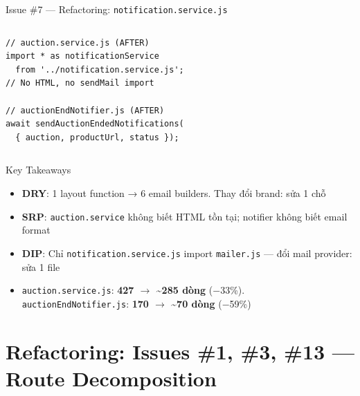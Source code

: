 \documentclass[12pt]{beamer}
\begin{document}
\begin{frame}[fragile]{Issue \#7 — Refactoring: \texttt{notification.service.js}}
\begin{columns}[t]
\begin{verbatim}
// auction.service.js (AFTER)
import * as notificationService
  from '../notification.service.js';
// No HTML, no sendMail import

// auctionEndNotifier.js (AFTER)
await sendAuctionEndedNotifications(
  { auction, productUrl, status });
    \end{verbatim}
  \end{columns}

  \begin{block}{Key Takeaways}
    \begin{itemize}
      \item \textbf{DRY}: 1 layout function → 6 email builders. Thay đổi brand: sửa 1 chỗ
      \item \textbf{SRP}: \texttt{auction.service} không biết HTML tồn tại; notifier không biết email format
      \item \textbf{DIP}: Chỉ \texttt{notification.service.js} import \texttt{mailer.js} — đổi mail provider: sửa 1 file
      \item \texttt{auction.service.js}: \textbf{427 $\to$ \textasciitilde{}285 dòng} ($-$33\%). \texttt{auctionEndNotifier.js}: \textbf{170 $\to$ \textasciitilde{}70 dòng} ($-$59\%)
    \end{itemize}
  \end{block}
\end{frame}

\section{Refactoring: Issues \#1, \#3, \#13 — Route Decomposition}
\end{document}

